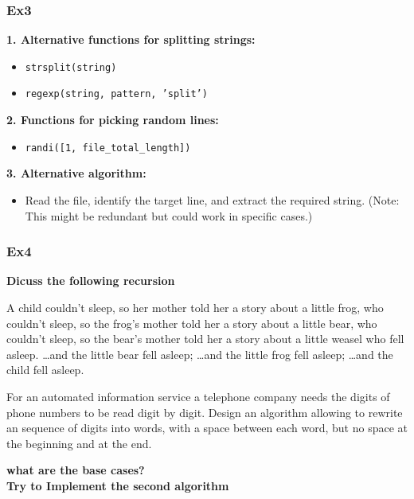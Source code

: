 \documentclass[
	11pt, %
]{beamer}
\begin{document}
\begin{frame}
	\frametitle{Ex3}

	\textbf{1. Alternative functions for splitting strings:}
    \begin{itemize}
        \item \texttt{strsplit(string)}
        \item \texttt{regexp(string, pattern, 'split')}
    \end{itemize}
    
    \textbf{2. Functions for picking random lines:}
    \begin{itemize}
        \item \texttt{randi([1, file\_total\_length])} 
    \end{itemize}
    
    \textbf{3. Alternative algorithm:}
    \begin{itemize}
        \item Read the file, identify the target line, and extract the required string.
        (Note: This might be redundant but could work in specific cases.)
    \end{itemize}
\end{frame}


\begin{frame}
	\frametitle{Ex4}

	\textbf{Dicuss the following recursion}

    A child couldn't sleep, so her mother told her a story about a little frog, who couldn't sleep, so the frog's mother told her a story about a little bear, who couldn't sleep, so the bear's mother told her a story about a little weasel who fell asleep. …and the little bear fell asleep; …and the little frog fell asleep; …and the child fell asleep.
    
    \bigskip
    For an automated information service a telephone company needs the digits of phone numbers to be read digit by digit. Design an algorithm allowing to rewrite an sequence of digits into words, with a space between each word, but no space at the beginning and at the end.

    \textbf{what are the base cases?}
    \\ \textbf{Try to Implement the second algorithm}

\end{frame}

\end{document}
